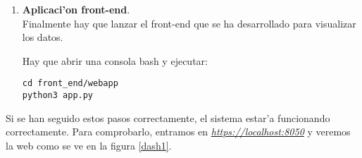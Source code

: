 \begin{enumerate}
\begin{enumerate}
\end{enumerate}


\item \textbf{Aplicaci'on front-end}.\\
Finalmente hay que lanzar el front-end que se ha desarrollado para visualizar los datos.

Hay que abrir una consola bash y ejecutar:
\begin{lstlisting}
cd front_end/webapp
python3 app.py
\end{lstlisting}





\end{enumerate}


Si se han seguido estos pasos correctamente, el sistema estar'a funcionando correctamente. Para comprobarlo, entramos en \href{https://localhost:8050}{\emph{https://localhost:8050}} y veremos la web como se ve en la figura \ref{dash1}.